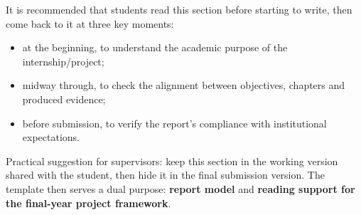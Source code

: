 It is recommended that students read this section before starting to write, then come back to it at three key moments:

\begin{itemize}[leftmargin=1.2cm]
\item at the beginning, to understand the academic purpose of the internship/project;
\item midway through, to check the alignment between objectives, chapters and produced evidence;
\item before submission, to verify the report's compliance with institutional expectations.
\end{itemize}

\begin{guidebox}
Practical suggestion for supervisors: keep this section in the working version shared with the student, then hide it in the final submission version. The template then serves a dual purpose: \textbf{report model} and \textbf{reading support for the final-year project framework}.
\end{guidebox}

